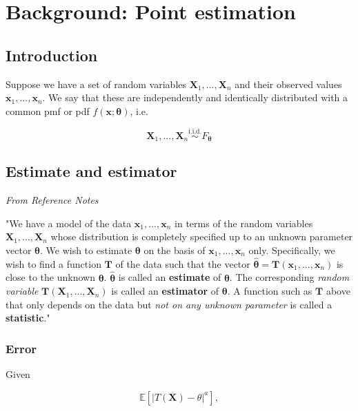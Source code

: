 \chapter[Background: Point estimation]{Background: Point estimation}


\section{Introduction}\label{sec:6intro}

Suppose we have a set of random variables \(\bm{X}_1, ..., \bm{X}_n\) and 
their observed values \(\bm{x}_1, ..., \bm{x}_n\). We say that these are 
independently and identically distributed with a common pmf or pdf \(f(\bm{x};\bm{\theta})\), 
i.e. 

\[\bm{X}_1, ..., \bm{X}_n \overset{\text{i.i.d.}}{\sim} F_{\bm{\theta}}\]

\section{Estimate and estimator}\label{sec:estimate and estimator}

\textit{From Reference Notes}

"We have a model of the data \(\bm{x}_1, ..., \bm{x}_n\) in terms of the random variables \(\bm{X}_1, ..., \bm{X}_n\) whose distribution is completely specified up to an unknown parameter vector \(\bm{\theta}\). 
We wish to estimate \(\bm{\theta}\) on the basis of \(\bm{x}_1, ..., \bm{x}_n\) only. 
Specifically, we wish to find a function \(\bm{T}\) of the data such that the vector \(\hat{\bm{\theta}} = \bm{T}(\bm{x}_1, ..., \bm{x}_n)\) is close to the unknown \(\bm{\theta}\). 
\(\hat{\bm{\theta}}\) is called an \textbf{estimate} of \(\bm{\theta}\). 
The corresponding \textit{random variable} \(\bm{T}(\bm{X}_1, ..., \bm{X}_n)\) is called an \textbf{estimator} of \(\bm{\theta}\). 
A function such as \(\bm{T}\) above that only depends on the data but \textit{not on any unknown parameter} is called a \textbf{statistic}."\autocite{reference}

\bigskip

\subsection{Error}

Given

\begin{equation}\label{eq:error}
    \mathbb{E}\left[\left|T(\bm{X}) − \theta \right|^a\right],
\end{equation}

